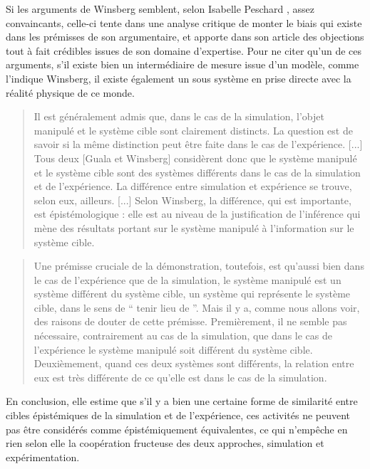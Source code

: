 Si les arguments de Winsberg semblent, selon Isabelle Peschard \autocites{Peschard2010b, Peschard2013}, assez convaincants, celle-ci tente dans une analyse critique de monter le biais qui existe dans les prémisses de son argumentaire, et apporte dans son article des objections tout à fait crédibles issues de son domaine d'expertise. Pour ne citer qu'un de ces arguments, s'il existe bien un intermédiaire de mesure issue d'un modèle, comme l'indique Winsberg, il existe également un sous système en prise directe avec la réalité physique de ce monde. 

\blockquote[\cite{Peschard2013}]{Il est généralement admis que, dans le cas de la simulation, l'objet manipulé et le système cible sont clairement distincts. La question est de savoir si la même distinction peut être faite dans le cas de l'expérience. [...] Tous deux [Guala et Winsberg] considèrent donc que le système manipulé et le système cible sont des systèmes différents dans le cas de la simulation et de l'expérience. La différence entre simulation et expérience se trouve, selon eux, ailleurs. [...] Selon Winsberg, la différence, qui est importante, est épistémologique : elle est au niveau de la justification de l'inférence qui mène des résultats portant sur le système manipulé à l'information sur le système cible.}

\blockquote[\cite{Peschard2013}]{Une prémisse cruciale de la démonstration, toutefois, est qu’aussi bien dans le cas de l’expérience que de la simulation, le système manipulé est un système différent du système cible, un système qui représente le système cible, dans le sens de \enquote{ tenir lieu de }. Mais il y a, comme nous allons voir, des raisons de douter de cette prémisse. Premièrement, il ne semble pas nécessaire, contrairement au cas de la simulation, que dans le cas de l’expérience le système manipulé soit différent du système cible. Deuxièmement, quand ces deux systèmes sont différents, la relation entre eux est très différente de ce qu’elle est dans le cas de la simulation.}

En conclusion, elle estime que s'il y a bien une certaine forme de similarité entre cibles épistémiques de la simulation et de l'expérience, ces activités ne peuvent pas être considérés comme épistémiquement équivalentes, ce qui n'empêche en rien selon elle la coopération fructeuse des deux approches, simulation et expérimentation. 

